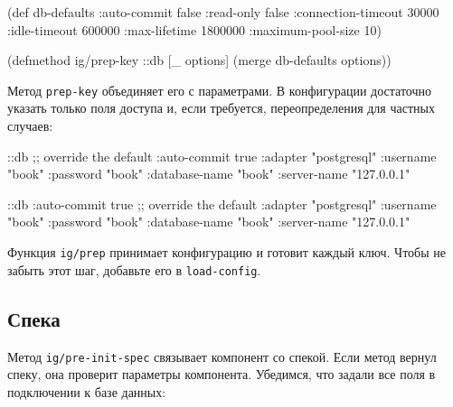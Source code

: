 \begin{english}
  \begin{clojure}
(def db-defaults
  {:auto-commit        false
   :read-only          false
   :connection-timeout 30000
   :idle-timeout       600000
   :max-lifetime       1800000
   :maximum-pool-size  10})

(defmethod ig/prep-key ::db
  [_ options]
  (merge db-defaults options))
  \end{clojure}
\end{english}

Метод \verb|prep-key| объединяет его с параметрами. В конфигурации достаточно
указать только поля доступа и, если требуется, переопределения для частных
случаев:

\ifx\DEVICETYPE\MOBILE

\begin{english}
  \begin{clojure}
{::db {;; override the default
       :auto-commit   true
       :adapter       "postgresql"
       :username      "book"
       :password      "book"
       :database-name "book"
       :server-name   "127.0.0.1"}}
  \end{clojure}
\end{english}

\else

\begin{english}
  \begin{clojure}
{::db {:auto-commit   true ;; override the default
       :adapter       "postgresql"
       :username      "book"
       :password      "book"
       :database-name "book"
       :server-name   "127.0.0.1"}}
  \end{clojure}
\end{english}

\fi

Функция \verb|ig/prep| принимает конфигурацию и готовит каждый ключ. Чтобы не
забыть этот шаг, добавьте его в \verb|load-config|.

\subsection{Спека}


Метод \verb|ig/pre-init-spec| связывает компонент со спекой. Если метод вернул
спеку, она проверит параметры компонента. Убедимся, что задали все поля в
подключении к базе данных:

\ifx\DEVICETYPE\MOBILE


